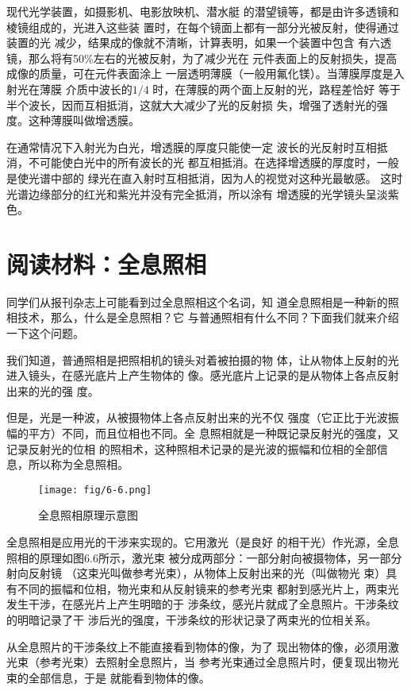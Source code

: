 现代光学装置，如摄影机、电影放映机、潜水艇
的潜望镜等，都是由许多透镜和棱镜组成的，光进入这些装
置时，在每个镜面上都有一部分光被反射，使得通过装置的光
减少，结果成的像就不清晰，计算表明，如果一个装置中包含
有六透镜，那么将有50\%左右的光被反射，为了减少光在
元件表面上的反射损失，提高成像的质量，可在元件表面涂上
一层透明薄膜（一般用氟化镁）。当薄膜厚度是入射光在薄膜
介质中波长的$1/4$
时，在薄膜的两个面上反射的光，路程差恰好
等于半个波长，因而互相抵消，这就大大减少了光的反射损
失，增强了透射光的强度。这种薄膜叫做增透膜。

在通常情况下入射光为白光，增透膜的厚度只能使一定
波长的光反射时互相抵消，不可能使白光中的所有波长的光
都互相抵消。在选择增透膜的厚度时，一般是使光谱中部的
绿光在直入射时互相抵消，因为人的视觉对这种光最敏感。
这时光谱边缘部分的红光和紫光并没有完全抵消，所以涂有
增透膜的光学镜头呈淡紫色。

\section*{阅读材料：全息照相}
同学们从报刊杂志上可能看到过全息照相这个名词，知
道全息照相是一种新的照相技术，那么，什么是全息照相？它
与普通照相有什么不同？下面我们就来介绍一下这个问题。

我们知道，普通照相是把照相机的镜头对着被拍摄的物
体，让从物体上反射的光进入镜头，在感光底片上产生物体的
像。感光底片上记录的是从物体上各点反射出来的光的强
度。

但是，光是一种波，从被摄物体上各点反射出来的光不仅
强度（它正比于光波振幅的平方）不同，而且位相也不同。全
息照相就是一种既记录反射光的强度，又记录反射光的位相
的照相术，这种照相术记录的是光波的振幅和位相的全部信
息，所以称为全息照相。
\begin{figure}[htp]\centering
    \texttt{[image: fig/6-6.png]}
    \caption{全息照相原理示意图}
    \end{figure}

全息照相是应用光的干涉来实现的。它用激光（是良好
的相干光）作光源，全息照相的原理如图6.6所示，激光束
被分成两部分：一部分射向被摄物体，另一部分射向反射镜
（这束光叫做参考光束），从物体上反射出来的光（叫做物光
束）具有不同的振幅和位相，物光束和从反射镜来的参考光束
都射到感光片上，两束光发生干涉，在感光片上产生明暗的于
涉条纹，感光片就成了全息照片。干涉条纹的明暗记录了干
涉后光的强度，干涉条纹的形状记录了两束光的位相关系。

从全息照片的干涉条纹上不能直接看到物体的像，为了
现出物体的像，必须用激光束（参考光束）去照射全息照片，当
参考光束通过全息照片时，便复现出物光束的全部信息，于是
就能看到物体的像。

